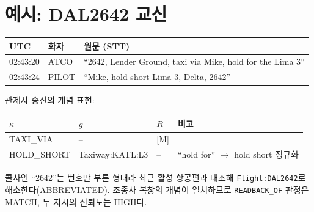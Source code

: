 \documentclass[10pt,a4paper]{article}
\newcommand{\cmd}[1]{\textsf{\small #1}}
\begin{document}
\section{예시: DAL2642 교신}
\begin{center}\small
\begin{tabularx}{\textwidth}{@{}l l >{\raggedright\arraybackslash}X@{}}
\toprule
UTC & 화자 & 원문 (STT)\\\midrule
02:43:20 & ATCO & ``2642, Lender Ground, taxi via Mike, hold for the Lima 3''\\
02:43:24 & PILOT & ``Mike, hold short Lima 3, Delta, 2642''\\
\bottomrule
\end{tabularx}
\end{center}
\noindent 관제사 송신의 개념 표현:
\begin{center}\small
\begin{tabular}{@{}l l l l@{}}
\toprule
$\kappa$ & $g$ & $R$ & 비고\\\midrule
\cmd{TAXI\_VIA} & -- & [M] & \\
\cmd{HOLD\_SHORT} & Taxiway:KATL:L3 & -- & ``hold for'' $\to$ hold short 정규화\\
\bottomrule
\end{tabular}
\end{center}
콜사인 ``2642''는 번호만 부른 형태라 최근 활성 항공편과 대조해 \texttt{Flight:DAL2642}로 해소한다(\cmd{ABBREVIATED}). 조종사 복창의 개념이 일치하므로 \texttt{READBACK\_OF} 판정은 \cmd{MATCH}, 두 지시의 신뢰도는 HIGH다.
\end{document}
